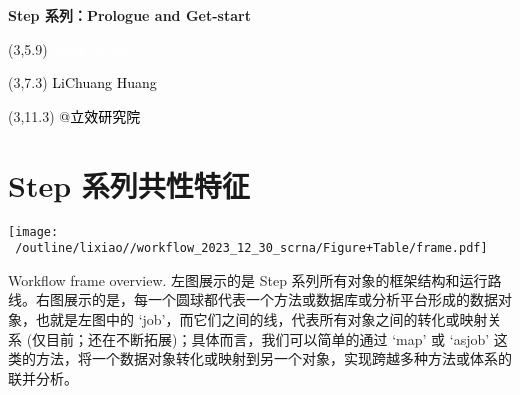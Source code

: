 \documentclass[
]{article}
\author{}
\date{\vspace{-2.5em}}
\begin{document}
\begin{titlepage} 
\begin{center} \textbf{\Huge Step 系列：Prologue
and Get-start} \vspace{4em}
\begin{textblock}{10}(3,5.9) \huge
\textbf{\textcolor{white}{2024-02-20}}
\end{textblock} \begin{textblock}{10}(3,7.3)
\Large \textcolor{black}{LiChuang Huang}
\end{textblock} \begin{textblock}{10}(3,11.3)
\Large \textcolor{black}{@立效研究院}
\end{textblock} \end{center} \end{titlepage}
\restoregeometry


\tableofcontents

\listoftables

\newpage


\hypertarget{step}{%
\section{Step 系列共性特征}\label{step}}



\def\@captype{figure}
\begin{center}
\texttt{[image: ~/outline/lixiao//workflow\_2023\_12\_30\_scrna/Figure+Table/frame.pdf]}
\caption{Workflow frame overview. 左图展示的是 Step 系列所有对象的框架结构和运行路线。右图展示的是，每一个圆球都代表一个方法或数据库或分析平台形成的数据对象，也就是左图中的 `job'，而它们之间的线，代表所有对象之间的转化或映射关系 (仅目前；还在不断拓展)；具体而言，我们可以简单的通过 `map' 或 `asjob' 这类的方法，将一个数据对象转化或映射到另一个对象，实现跨越多种方法或体系的联并分析。}\label{fig:Workflow frame overview. 左图展示的是 Step 系列所有对象的框架结构和运行路线。右图展示的是，每一个圆球都代表一个方法或数据库或分析平台形成的数据对象，也就是左图中的 `job'，而它们之间的线，代表所有对象之间的转化或映射关系 (仅目前；还在不断拓展)；具体而言，我们可以简单的通过 `map' 或 `asjob' 这类的方法，将一个数据对象转化或映射到另一个对象，实现跨越多种方法或体系的联并分析。}
\end{center}
\end{document}
